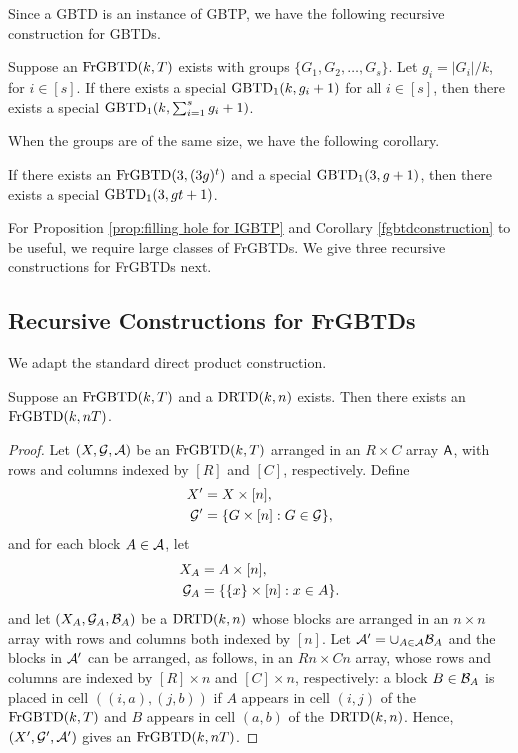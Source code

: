 \documentclass[draft, 11pt]{article}
\begin{document}
 Since a GBTD is an instance of GBTP, we have the following recursive construction
for GBTDs.
 

 \begin{corollary}
 \label{fgbtdconstruction} Suppose an ${\rm FrGBTD}(k,T)$ exists
 with groups $\{G_1,G_2,\ldots,G_s\}$. Let
 $g_i=|G_i|/k$, for $i\in[s]$. If there exists a special
 $\textrm{GBTD}_1(k,g_i+1)$ for all $i\in[s]$, then there exists a special
 $\textrm{GBTD}_1(k,\sum_{i=1}^s g_i+1)$.
 \end{corollary}
 

 When the groups are of the same size, we have the following corollary.
  

\begin{corollary}
\label{gbtd:gt+1}
If there exists an ${\rm FrGBTD}(3,(3g)^t)$ and a special ${\rm GBTD}_1(3,g+1)$,
then there exists a special ${\rm GBTD}_1(3,gt+1)$.
\end{corollary}



For Proposition \ref{prop:filling hole for IGBTP} and Corollary
\ref{fgbtdconstruction} to be useful, we require large classes of
FrGBTDs. We give three recursive constructions for FrGBTDs next.




\subsection{Recursive Constructions for FrGBTDs}

We adapt the standard direct product construction.

\begin{proposition}[Inflation]
\label{prop:inflation} Suppose an ${\rm FrGBTD}(k,T)$
and a ${\rm DRTD}(k,n)$ exists. Then there exists an ${\rm FrGBTD}(k,nT)$.
\end{proposition}

\begin{proof}
Let $(X,\mathcal G,\mathcal A)$ be an ${\rm FrGBTD}(k,T)$ arranged in an $R\times C$
array ${\sf A}$, with rows and columns indexed by $[R]$ and $[C]$,
respectively. Define
\begin{align*}
X' &= X\times [n], \\
\mathcal G' &= \{G\times [n]: G\in\mathcal G\},
\end{align*}
and for each block $A\in\mathcal A$, let
\begin{align*}
X_A &= A\times [n], \\
\mathcal G_A &= \{ \{x\}\times[n]: x \in A \}.
\end{align*}
and let $(X_A,\mathcal G_A,\mathcal B_A)$ be a ${\rm DRTD}(k,n)$ whose blocks are
arranged in an $n\times n$ array with rows and columns both indexed
by $[n]$. Let $\mathcal A'=\cup_{A\in\mathcal A}\mathcal B_A$ and the blocks in $\mathcal A'$ can be
arranged, as follows, in an $Rn\times Cn$ array, whose rows and
columns are indexed by $[R]\times n$ and $[C]\times n$,
respectively: a block $B\in\mathcal B_A$ is placed in cell $((i,a),(j,b))$
if $A$ appears in cell $(i,j)$ of the ${\rm FrGBTD}(k,T)$ and $B$
appears in cell $(a,b)$ of the ${\rm DRTD}(k,n)$. Hence,
$(X',\mathcal G',\mathcal A')$ gives an ${\rm FrGBTD}(k,nT)$.
\end{proof}
\vskip 10pt
\end{document}
